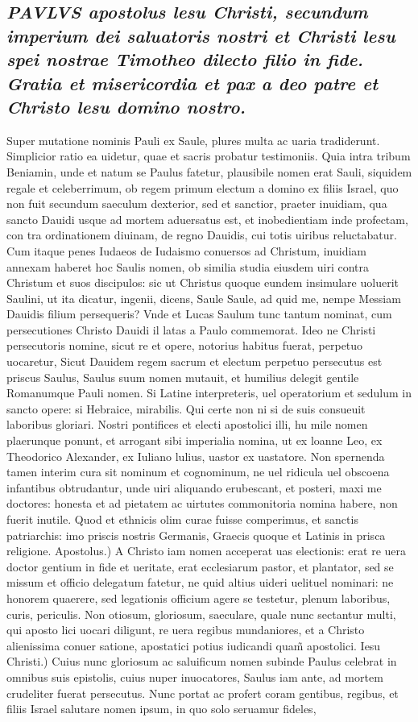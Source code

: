 \documentclass{article}
\begin{document}
\begin{pages}
\subsection*{\textit{\huge\textbf{P}\normalsize AVLVS apostolus lesu Christi, secundum imperium dei saluatoris nostri et Christi lesu spei nostrae Timotheo dilecto filio in fide. Gratia et misericordia et pax a deo patre et Christo lesu domino nostro. }}\pstart Super mutatione nominis Pauli ex Saule, plures multa ac uaria tradiderunt. Simplicior ratio ea uidetur, quae et sacris probatur testimoniis. Quia intra tribum Beniamin, unde et natum se Paulus fatetur, plausibile nomen erat Sauli, siquidem regale et celeberrimum, ob regem primum electum a domino ex filiis Israel, quo non fuit secundum saeculum dexterior, sed et sanctior, praeter inuidiam, qua sancto Dauidi usque ad mortem aduersatus est, et inobedientiam inde profectam, con tra ordinationem diuinam, de regno Dauidis, cui totis uiribus reluctabatur. Cum itaque penes Iudaeos de Iudaismo conuersos ad Christum, inuidiam annexam haberet hoc Saulis nomen, ob similia studia eiusdem uiri contra Christum et suos discipulos: sic ut Christus quoque eundem insimulare uoluerit Saulini, ut ita dicatur, ingenii, dicens, Saule Saule, ad quid me, nempe Messiam Dauidis filium persequeris? Vnde et Lucas Saulum tunc tantum nominat, cum persecutiones Christo Dauidi il latas a Paulo commemorat. Ideo ne Christi persecutoris nomine, sicut re et opere, notorius habitus fuerat, perpetuo uocaretur, Sicut Dauidem regem sacrum et electum perpetuo persecutus est priscus Saulus, Saulus suum nomen mutauit, et humilius delegit gentile Romanumque Pauli nomen. Si Latine interpreteris, uel operatorium et sedulum in sancto opere: si Hebraice, mirabilis. Qui certe non ni si de suis consueuit laboribus gloriari. Nostri pontifices et electi apostolici illi, hu mile nomen plaerunque ponunt, et arrogant sibi imperialia nomina, ut ex loanne Leo, ex Theodorico Alexander, ex Iuliano lulius, uastor ex uastatore. Non spernenda tamen interim cura sit nominum et cognominum, ne uel ridicula uel obscoena infantibus obtrudantur, unde uiri aliquando erubescant, et posteri, maxi me doctores: honesta et ad pietatem ac uirtutes commonitoria nomina habere, non fuerit inutile. Quod et ethnicis olim curae fuisse comperimus, et sanctis patriarchis: imo priscis nostris Germanis, Graecis quoque et Latinis in prisca religione. Apostolus.) A Christo iam nomen acceperat uas electionis: erat re uera doctor gentium in fide et ueritate, erat ecclesiarum pastor, et plantator, sed se missum et officio delegatum fatetur, ne quid altius uideri uelituel nominari: ne honorem quaerere, sed legationis officium agere se testetur, plenum laboribus, curis, periculis. Non otiosum, gloriosum, saeculare, quale nunc sectantur multi, qui aposto lici uocari diligunt, re uera regibus mundaniores, et a Christo alienissima conuer satione, apostatici potius iudicandi quam̃ apostolici. Iesu Christi.) Cuius nunc gloriosum ac saluificum nomen subinde Paulus celebrat in omnibus suis epistolis, cuius nuper inuocatores, Saulus iam ante, ad mortem crudeliter fuerat persecutus. Nunc portat ac profert coram gentibus, regibus, et filiis Israel salutare nomen ipsum, in quo solo seruamur fideles, 
\end{pages}
\end{document}

